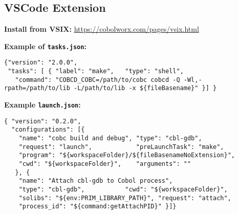 \documentclass[10pt,landscape]{article}
\begin{document}
\begin{multicols}{3}
  \subsection{VSCode Extension}

{\bf Install from VSIX:}
\url{https://cobolworx.com/pages/vsix.html}

{\bf Example of \verb+tasks.json+:}\vspace{-3mm}
\begin{verbatim}
{"version": "2.0.0",
 "tasks": [ { "label": "make",   "type": "shell",
   "command": "COBCD_COBC=/path/to/cobc cobcd -Q -Wl,-rpath=/path/to/lib -L/path/to/lib -x ${fileBasename}" }] }
\end{verbatim}\vspace{-2mm}
{\bf Example \verb+launch.json+:}\vspace{-3mm}
\begin{verbatim}
{ "version": "0.2.0",
  "configurations": [{
    "name": "cobc build and debug", "type": "cbl-gdb",
    "request": "launch",            "preLaunchTask": "make",
    "program": "${workspaceFolder}/${fileBasenameNoExtension}",
    "cwd": "${workspaceFolder}",    "arguments": ""
   }, {
    "name": "Attach cbl-gdb to Cobol process",
    "type": "cbl-gdb",           "cwd": "${workspaceFolder}",
    "solibs": "${env:PRIM_LIBRARY_PATH}", "request": "attach",
    "process_id": "${command:getAttachPID}" }]}
\end{verbatim}

\end{multicols}


\newpage
\end{document}
